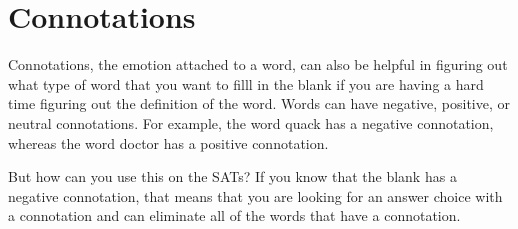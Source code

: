 \section{Connotations}

Connotations, the emotion attached to a word, can also be helpful in figuring out what type of
word that you want to filll in the blank if you are having a hard time figuring out the definition
of the word. Words can have negative, positive, or neutral connotations. For example, the word
quack has a negative connotation, whereas the word doctor has a positive connotation.

But how can you use this on the SATs? If you know that the blank has a negative connotation, that means that you are looking for an
\underline{\hspace{2in}} answer choice with a connotation and can eliminate all of the words that have a \underline{\hspace{2in}} connotation.


